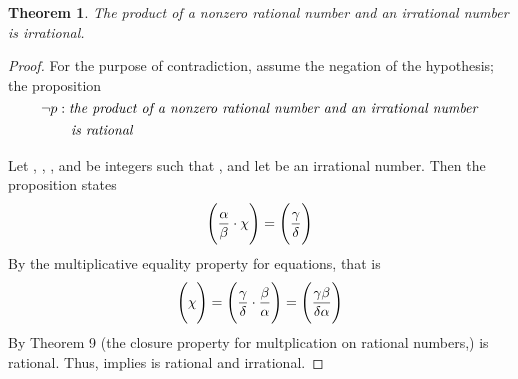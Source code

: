 \documentclass[preview]{standalone}
\newtheorem{theorem}{Theorem}
\begin{document}
\begin{theorem} %
    The product of a nonzero rational number and an irrational number is 
    irrational.
\end{theorem}

\begin{proof}
    For the purpose of contradiction, assume the negation of the hypothesis; 
    the proposition 
        $$\lnot p : \emph{the product of a nonzero rational number and an 
        irrational number}$$
        $\indent \indent \indent \emph{is rational}$
        \\ \\
    Let \bm{$\alpha$}, \bm{$\beta$}, \bm{$\gamma$}, and \bm{$\delta$} be integers such that 
    , and let \bm{$\chi$} be an irrational number. 
    Then the proposition  states 
    \begin{equation*}
        \Bigg(
            \frac{\alpha}{\beta} \space \cdot \space \chi 
        \Bigg)
            = 
        \Bigg(
            \frac{\gamma}{\delta}
        \Bigg)
    \end{equation*}    
    By the multiplicative equality property for equations, that is
    \begin{equation*}
        \Bigg(
            \chi
        \Bigg) 
            = 
        \Bigg(
            \frac{\gamma}{\delta} \space \cdot \space \frac{\beta}{\alpha} 
        \Bigg)
            =
        \Bigg( 
            \frac{\gamma\beta}{\delta\alpha}
        \Bigg)
    \end{equation*}
    By Theorem 9 (the closure property for multplication on rational numbers,) 
    \bm{$\chi$} is rational. 
    Thus,  implies \bm{$\chi$} is rational and irrational.
\color{lightgray} \end{proof}
\
\end{document}
